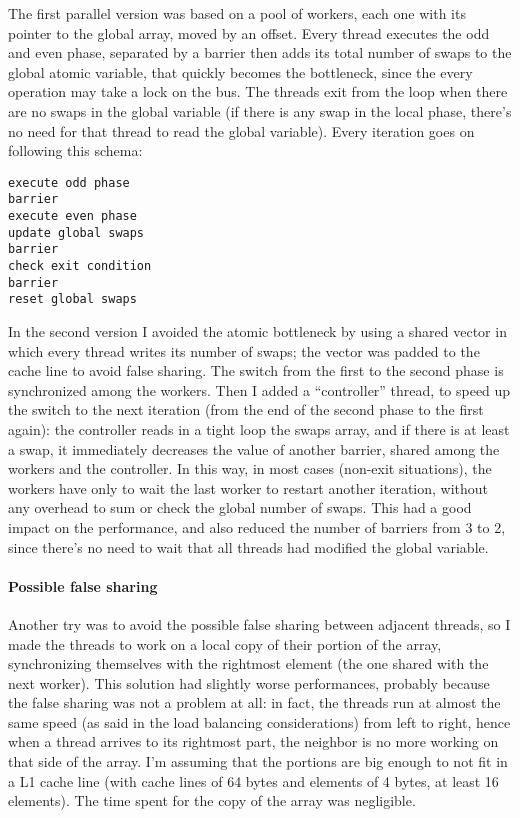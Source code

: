 The first parallel version was based on a pool of workers, each one with its pointer to the global array, moved by an offset. Every thread executes the odd and even phase, separated by a barrier then adds its total number of swaps to the global atomic variable, that quickly becomes the bottleneck, since the every operation may take a lock on the bus. The threads exit from the loop when there are no swaps in the global variable (if there is any swap in the local phase, there's no need for that thread to read the global variable). Every iteration goes on following this schema:
\begin{verbatim}
execute odd phase
barrier
execute even phase
update global swaps
barrier
check exit condition
barrier
reset global swaps
\end{verbatim}

In the second version I avoided the atomic bottleneck by using a shared vector in which every thread writes its number of swaps; the vector was padded to the cache line to avoid false sharing. The switch from the first to the second phase is synchronized among the workers. Then I added a ``controller'' thread, to speed up the switch to the next iteration (from the end of the second phase to the first again): the controller reads in a tight loop the swaps array, and if there is at least a swap, it immediately decreases the value of another barrier, shared among the workers and the controller. In this way, in most cases (non-exit situations), the workers have only to wait the last worker to restart another iteration, without any overhead to sum or check the global number of swaps. This had a good impact on the performance, and also reduced the number of barriers from 3 to 2, since there's no need to wait that all threads had modified the global variable.

\paragraph{Possible false sharing}
Another try was to avoid the possible false sharing between adjacent threads, so I made the threads to work on a local copy of their portion of the array, synchronizing themselves with the rightmost element (the one shared with the next worker). This solution had slightly worse performances, probably because the false sharing was not a problem at all: in fact, the threads run at almost the same speed (as said in the load balancing considerations) from left to right, hence when a thread arrives to its rightmost part, the neighbor is no more working on that side of the array. I'm assuming that the portions are big enough to not fit in a L1 cache line (with cache lines of 64 bytes and elements of 4 bytes, at least 16 elements). The time spent for the copy of the array was negligible.

